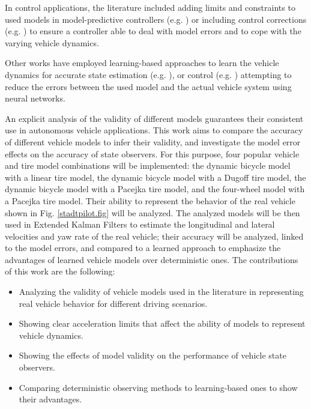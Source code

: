 \documentclass[journal]{IEEEtran}
\begin{document}
In control applications, the literature included adding limits and constraints to used models in model-predictive controllers (e.g. \cite{beal_model_2013, jalali_model_2017}) or including control corrections (e.g. \cite{choi_model_2014}) to ensure a controller able to deal with model errors and to cope with the varying vehicle dynamics. 

Other works have employed learning-based approaches to learn the vehicle dynamics for accurate state estimation (e.g. \cite{revach_kalmannet_2021, choi_split-kalmannet_2023, bou_ghosn_learning-based_2022}), or control (e.g. \cite{williams_aggressive_2016,spielberg_neural_2022}) attempting to reduce the errors between the used model and the actual vehicle system using neural networks. 

An explicit analysis of the validity of different models guarantees their consistent use in autonomous vehicle applications. This work aims to compare the accuracy of different vehicle models to infer their validity, and investigate the model error effects on the accuracy of state observers. For this purpose, four popular vehicle and tire model combinations will be implemented: the dynamic bicycle model with a linear tire model, the dynamic bicycle model with a Dugoff tire model, the dynamic bicycle model with a Pacejka tire model, and the four-wheel model with a Pacejka tire model. Their ability to represent the behavior of the real vehicle shown in Fig. \ref{stadtpilot.fig} will be analyzed. The analyzed models will be then used in Extended Kalman Filters to estimate the longitudinal and lateral velocities and yaw rate of the real vehicle; their accuracy will be analyzed, linked to the model errors, and compared to a learned approach to emphasize the advantages of learned vehicle models over deterministic ones. The contributions of this work are the following:
\begin{itemize}
    \item Analyzing the validity of vehicle models used in the literature in representing real vehicle behavior for different driving scenarios.
    \item Showing clear acceleration limits that affect the ability of models to represent vehicle dynamics.
    \item Showing the effects of model validity on the performance of vehicle state observers. 
    \item Comparing deterministic observing methods to learning-based ones to show their advantages. 
\end{itemize}
\end{document}

